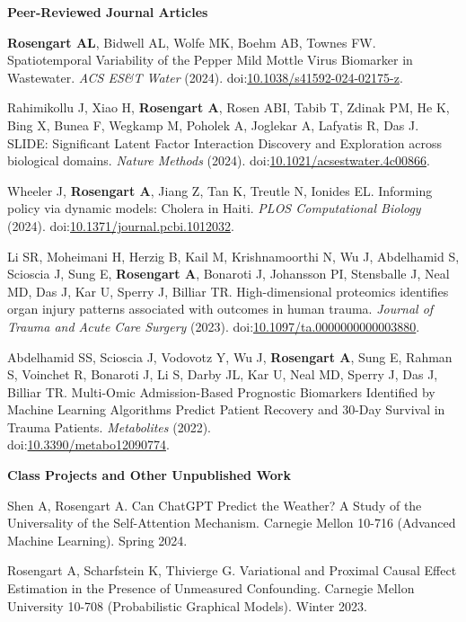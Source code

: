 \documentclass[10pt]{article}
\newcommand\doilink[1]{\href{https://dx.doi.org/#1}{#1}}
\newcommand\doi[1]{doi:\doilink{#1}}
\begin{document}
\textbf{Peer-Reviewed Journal Articles}
\begin{enumerate}[label= {[\arabic*]}]
\item {\bf Rosengart AL}, Bidwell AL, Wolfe MK, Boehm AB, Townes FW. Spatiotemporal Variability of the Pepper Mild Mottle Virus Biomarker in Wastewater. {\it ACS ES\&T Water} (2024). \doi{10.1038/s41592-024-02175-z}.
\item Rahimikollu J, Xiao H, {\bf Rosengart A}, Rosen ABI, Tabib T, Zdinak PM, He K, Bing X, Bunea F, Wegkamp M, Poholek A, Joglekar A, Lafyatis R, Das J. SLIDE: Significant Latent Factor Interaction Discovery and Exploration across biological domains. {\it Nature Methods} (2024). \doi{10.1021/acsestwater.4c00866}.
\item Wheeler J, {\bf Rosengart A}, Jiang Z, Tan K, Treutle N, Ionides EL. Informing policy via dynamic models: Cholera in Haiti. {\it PLOS Computational Biology} (2024). \doi{10.1371/journal.pcbi.1012032}.
\item Li SR, Moheimani H, Herzig B, Kail M, Krishnamoorthi N, Wu J, Abdelhamid S, Scioscia J, Sung E, {\bf Rosengart A}, Bonaroti J, Johansson PI, Stensballe J, Neal MD, Das J, Kar U, Sperry J, Billiar TR. High-dimensional proteomics identifies organ injury patterns associated with outcomes in human trauma. {\it Journal of Trauma and Acute Care Surgery} (2023). \doi{10.1097/ta.0000000000003880}.
\item Abdelhamid SS, Scioscia J, Vodovotz Y, Wu J, {\bf Rosengart A}, Sung E, Rahman S, Voinchet R, Bonaroti J, Li S, Darby JL, Kar U, Neal MD, Sperry J, Das J, Billiar TR. Multi-Omic Admission-Based Prognostic Biomarkers Identified by Machine Learning Algorithms Predict Patient Recovery and 30-Day Survival in Trauma Patients. {\it Metabolites} (2022). \\ 
\doi{10.3390/metabo12090774}.
\end{enumerate}

\textbf{Class Projects and Other Unpublished Work}
\begin{enumerate}[label= {[\arabic*]}]
\item Shen A, Rosengart A. Can ChatGPT Predict the Weather? A Study of the Universality of the Self-Attention Mechanism. Carnegie Mellon 10-716 (Advanced Machine Learning). Spring 2024. 
\item Rosengart A, Scharfstein K, Thivierge G. Variational and Proximal Causal Effect Estimation in the Presence of Unmeasured Confounding. Carnegie Mellon University 10-708 (Probabilistic Graphical Models). Winter 2023.
\end{enumerate}
\end{document}
